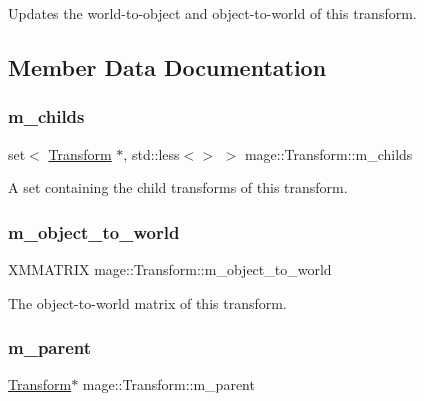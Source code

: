 Updates the world-\/to-\/object and object-\/to-\/world of this transform. 

\subsection{Member Data Documentation}
\hypertarget{structmage_1_1_transform_ae5636bac77531caccf97a79cb22b6915}{}\label{structmage_1_1_transform_ae5636bac77531caccf97a79cb22b6915} 
\subsubsection{\texorpdfstring{m\+\_\+childs}{m\_childs}}
{\footnotesize\ttfamily set$<$ \hyperlink{structmage_1_1_transform}{Transform} $\ast$, std\+::less$<$$>$ $>$ mage\+::\+Transform\+::m\+\_\+childs\hspace{0.3cm}{\ttfamily [private]}}

A set containing the child transforms of this transform. \hypertarget{structmage_1_1_transform_a4e227321c984ddf2ece92d7954ae5db9}{}\label{structmage_1_1_transform_a4e227321c984ddf2ece92d7954ae5db9} 
\subsubsection{\texorpdfstring{m\+\_\+object\+\_\+to\+\_\+world}{m\_object\_to\_world}}
{\footnotesize\ttfamily X\+M\+M\+A\+T\+R\+IX mage\+::\+Transform\+::m\+\_\+object\+\_\+to\+\_\+world\hspace{0.3cm}{\ttfamily [private]}}

The object-\/to-\/world matrix of this transform. \hypertarget{structmage_1_1_transform_a5ddf9b608e25dc0dbe82016d926e29b5}{}\label{structmage_1_1_transform_a5ddf9b608e25dc0dbe82016d926e29b5} 
\subsubsection{\texorpdfstring{m\+\_\+parent}{m\_parent}}
{\footnotesize\ttfamily \hyperlink{structmage_1_1_transform}{Transform}$\ast$ mage\+::\+Transform\+::m\+\_\+parent\hspace{0.3cm}{\ttfamily [private]}}

